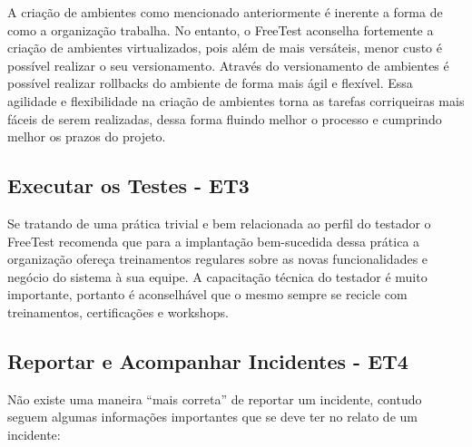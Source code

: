 A criação de ambientes como mencionado anteriormente é inerente a forma de como a organização trabalha. No entanto, o FreeTest aconselha fortemente a criação de ambientes virtualizados, pois além de mais versáteis, menor custo é possível realizar o seu versionamento. Através do versionamento de ambientes é possível realizar rollbacks do ambiente de forma mais ágil e flexível. Essa agilidade e flexibilidade na criação de ambientes torna as tarefas corriqueiras mais fáceis de serem realizadas, dessa forma fluindo melhor o processo e cumprindo melhor os prazos do projeto.


\subsection{Executar os Testes - ET3}
\label{sec:guiaet3}

Se tratando de uma prática trivial e bem relacionada ao perfil do testador o FreeTest recomenda que para a implantação bem-sucedida dessa prática a organização ofereça treinamentos regulares sobre as novas funcionalidades e negócio do sistema à sua equipe. A capacitação técnica do testador é muito importante, portanto é aconselhável que o mesmo sempre se recicle com treinamentos, certificações e workshops.

\subsection{Reportar e Acompanhar Incidentes - ET4}
\label{sec:guiaet4}

Não existe uma maneira “mais correta” de reportar um incidente, contudo seguem algumas informações importantes que se deve ter no relato de um incidente:

